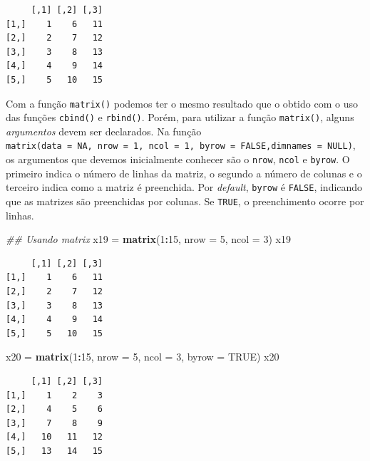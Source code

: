 \documentclass[]{book}
\makeatletter
\newenvironment{Shaded}{\begin{snugshade}}{\end{snugshade}}
\newcommand{\CommentTok}[1]{\textcolor[rgb]{0.56,0.35,0.01}{\textit{#1}}}
\newcommand{\DataTypeTok}[1]{\textcolor[rgb]{0.13,0.29,0.53}{#1}}
\newcommand{\DecValTok}[1]{\textcolor[rgb]{0.00,0.00,0.81}{#1}}
\newcommand{\KeywordTok}[1]{\textcolor[rgb]{0.13,0.29,0.53}{\textbf{#1}}}
\newcommand{\NormalTok}[1]{#1}
\newcommand{\OperatorTok}[1]{\textcolor[rgb]{0.81,0.36,0.00}{\textbf{#1}}}
\newcommand{\OtherTok}[1]{\textcolor[rgb]{0.56,0.35,0.01}{#1}}
\newcommand{\StringTok}[1]{\textcolor[rgb]{0.31,0.60,0.02}{#1}}
\newcommand{\indf}[1]{\index[function]{#1@\texttt{#1()}|ST}}
\makeatother
\begin{document}
\begin{verbatim}
     [,1] [,2] [,3]
[1,]    1    6   11
[2,]    2    7   12
[3,]    3    8   13
[4,]    4    9   14
[5,]    5   10   15
\end{verbatim}

Com a função \texttt{matrix()} \indf{matrix} podemos ter o mesmo resultado que o obtido com o uso das funções \texttt{cbind()} e \texttt{rbind()}. Porém, para utilizar a função \texttt{matrix()}, alguns \emph{argumentos} devem ser declarados. Na função \texttt{matrix(data\ =\ NA,\ nrow\ =\ 1,\ ncol\ =\ 1,\ byrow\ =\ FALSE,dimnames\ =\ NULL)}, os argumentos que devemos inicialmente conhecer são o \texttt{nrow}, \texttt{ncol} e \texttt{byrow}. O primeiro indica o número de linhas da matriz, o segundo a número de colunas e o terceiro indica como a matriz é preenchida. Por \emph{default}, \texttt{byrow} é \texttt{FALSE}, indicando que as matrizes são preenchidas por colunas. Se \texttt{TRUE}, o preenchimento ocorre por linhas.

\begin{Shaded}
\begin{Highlighting}[]
\CommentTok{## Usando matrix}
\NormalTok{x19 =}\StringTok{ }\KeywordTok{matrix}\NormalTok{(}\DecValTok{1}\OperatorTok{:}\DecValTok{15}\NormalTok{, }\DataTypeTok{nrow =} \DecValTok{5}\NormalTok{, }\DataTypeTok{ncol =} \DecValTok{3}\NormalTok{)}
\NormalTok{x19}
\end{Highlighting}
\end{Shaded}

\begin{verbatim}
     [,1] [,2] [,3]
[1,]    1    6   11
[2,]    2    7   12
[3,]    3    8   13
[4,]    4    9   14
[5,]    5   10   15
\end{verbatim}

\begin{Shaded}
\begin{Highlighting}[]
\NormalTok{x20 =}\StringTok{ }\KeywordTok{matrix}\NormalTok{(}\DecValTok{1}\OperatorTok{:}\DecValTok{15}\NormalTok{, }\DataTypeTok{nrow =} \DecValTok{5}\NormalTok{, }\DataTypeTok{ncol =} \DecValTok{3}\NormalTok{, }\DataTypeTok{byrow =} \OtherTok{TRUE}\NormalTok{)}
\NormalTok{x20}
\end{Highlighting}
\end{Shaded}

\begin{verbatim}
     [,1] [,2] [,3]
[1,]    1    2    3
[2,]    4    5    6
[3,]    7    8    9
[4,]   10   11   12
[5,]   13   14   15
\end{verbatim}
\end{document}
